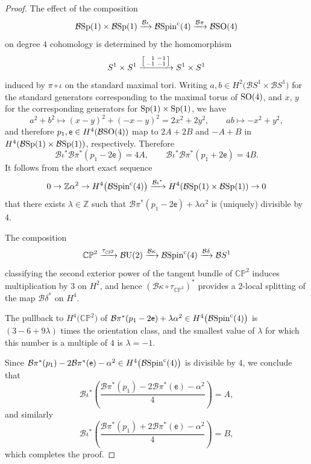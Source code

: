\documentclass[pdftex]{sigma}%
\newcommand{\CP}{\mathbb{CP}}
\newcommand{\Z}{\mathbb{Z}}
\numberwithin{equation}{section}
\begin{document}
\begin{proof}
The effect of the composition
\[ {\mathcal B}{\rm Sp}(1) \times {\mathcal B}{\rm Sp}(1) \xrightarrow{{\mathcal B}\iota} {\mathcal B}{\rm Spin}^{\rm c}(4) \xrightarrow{{\mathcal B}\pi} {\mathcal B}{\rm SO}(4) \]
on degree $4$ cohomology is determined by the homomorphism
\[
S^1 \times S^1 \xrightarrow{ \left[\begin{smallmatrix} \hphantom{-}1 & -1 \\ -1 & -1 \end{smallmatrix}\right] } S^1 \times S^1
\]
induced by $\pi \circ \iota$ on the standard maximal tori.
Writing $a,b \in H^2\big({\mathcal B}S ^1 \times {\mathcal B}S ^1\big)$ for the standard generators corresponding to the maximal torus of ${\rm SO}(4)$, and $x$, $y$ for
the corresponding generators for ${\rm Sp}(1)\times {\rm Sp}(1)$, we have
\[ a^2+b^2 \mapsto (x-y)^2+ (-x-y)^2= 2x^2 +2y^2, \qquad ab \mapsto -x^2+y^2, \]
and therefore $p_1,\mathsf{e} \in H^4({\mathcal B}{\rm SO}(4))$ map to $2A + 2B$ and $-A+B$ in $H^4({\mathcal B}{\rm Sp}(1)\times {\mathcal B}{\rm Sp}(1))$, respectively. Therefore
\[ {\mathcal B}\iota^* {\mathcal B}\pi^* (p_1 -2\mathsf{e}) = 4A, \qquad {\mathcal B}\iota^* {\mathcal B}\pi^* (p_1+2\mathsf{e}) = 4B.\]
It follows from the short exact sequence
\[
0 \to \Z\alpha^2 \to H^4\big({\mathcal B}{\rm Spin}^{\rm c}(4)\big) \xrightarrow{{\mathcal B}\iota^*} H^4({\mathcal B}{\rm Sp}(1)\times {\mathcal B}{\rm Sp}(1)) \to 0
\]
that there exists $\lambda \in \Z$ such that ${\mathcal B}\pi^*(p_1-2\mathsf{e}) + \lambda \alpha^2$
is (uniquely) divisible by $4$.

The composition
\[
\CP^2 \xrightarrow{\tau_{\CP^2}} {\mathcal B}{\rm U}(2) \xrightarrow{{\mathcal B}\kappa} {\mathcal B}{\rm Spin}^{\rm c}(4)
\xrightarrow{{\mathcal B}\delta} {\mathcal B}S ^1
\]
classifying the second exterior power of the tangent bundle of $\CP^2$ induces multiplication by $3$ on $H^2$, and hence $({\mathcal B}\kappa \circ \tau_{\CP^2})^*$ provides a $2$-local splitting of the map ${\mathcal B}\delta^*$ on $H^4$.

The pullback to $H^4\big(\CP^2\big)$ of
${\mathcal B}\pi^*(p_1 - 2\mathsf{e}) + \lambda \alpha^2 \in H^4\big({\mathcal B}{\rm Spin}^{\rm c}(4)\big)$ is
$(3-6+9\lambda)$ times the orientation class, and the smallest value of
$\lambda$ for which this number is a multiple of $4$ is $\lambda=-1$.

Since ${\mathcal B}\pi^*(p_1) - 2{\mathcal B}\pi^*(\mathsf{e}) - \alpha^2 \in H^4\big({\mathcal B}{\rm Spin}^{\rm c}(4)\big)$ is divisible
by $4$, we conclude that
\[
{\mathcal B}\iota^*\left( \frac{ {\mathcal B}\pi^*(p_1) - 2{\mathcal B}\pi^*(\mathsf{e}) - \alpha^2 }{4} \right)=A,
\]
and similarly
\[
{\mathcal B}\iota^*\left( \frac{ {\mathcal B}\pi^*(p_1) + 2{\mathcal B}\pi^*(\mathsf{e}) - \alpha^2 }{4} \right)=B,
\]
which completes the proof.
\end{proof}
\end{document}
